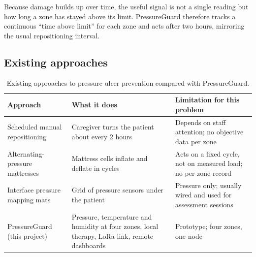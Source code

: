 Because damage builds up over time, the useful signal is not a single reading but how long a zone has stayed above its limit. PressureGuard therefore tracks a continuous ``time above limit'' for each zone and acts after two hours, mirroring the usual repositioning interval.

\subsection{Existing approaches}
{\small{}
\begin{table}[H]
\centering
\begin{tabularx}{\textwidth}{@{}>{\raggedright\arraybackslash}p{3.3cm}XX@{}}
\toprule
\textbf{Approach} & \textbf{What it does} & \textbf{Limitation for this problem}\\
\midrule
Scheduled manual repositioning & Caregiver turns the patient about every 2 hours & Depends on staff attention; no objective data per zone\\
Alternating-pressure mattresses & Mattress cells inflate and deflate in cycles & Acts on a fixed cycle, not on measured load; no per-zone record\\
Interface pressure mapping mats & Grid of pressure sensors under the patient & Pressure only; usually wired and used for assessment sessions\\
PressureGuard (this project) & Pressure, temperature and humidity at four zones, local therapy, LoRa link, remote dashboards & Prototype; four zones, one node\\
\bottomrule
\end{tabularx}
\caption{Existing approaches to pressure ulcer prevention compared with PressureGuard.}
\end{table}}

